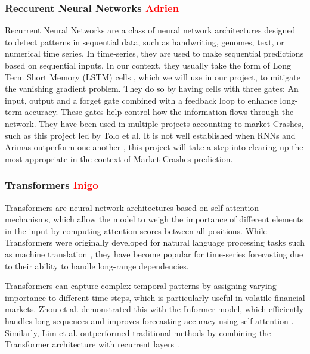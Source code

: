 \documentclass[12pt, letterpaper]{article}
\begin{document}
    \subsubsection*{Reccurent Neural Networks \textcolor{red}{Adrien}}
    Recurrent Neural Networks are a class of neural network architectures designed to detect patterns in sequential data, such as handwriting, genomes, text, or numerical time series. In time-series, they are used to make sequential predictions based on sequential inputs. \cite{Schmidt} In our context, they usually take the form of Long Term Short Memory (LSTM) cells \cite{Hansika}, which we will use in our project, to mitigate the vanishing gradient problem. They do so by having cells with three gates: An input, output and a forget gate combined with a feedback loop to enhance long-term accuracy. These gates help control how the information flows through the network. \cite{Hansika} They have been used in multiple projects accounting to market Crashes, such as this project led by Tolo et al. \cite{Tolo} It is not well established when RNNs and Arimas outperform one another \cite{Hansika}, this project will take a step into clearing up the most appropriate in the context of Market Crashes prediction.

    \subsubsection*{Transformers \textcolor{red}{Inigo}}
Transformers are neural network architectures based on self-attention mechanisms, which allow the model to weigh the importance of different elements in the input by computing attention scores between all positions. While Transformers were originally developed for natural language processing tasks such as machine translation \cite{vaswani2017attention}, they have become popular for time-series forecasting due to their ability to handle long-range dependencies.

Transformers can capture complex temporal patterns by assigning varying importance to different time steps, which is particularly useful in volatile financial markets. Zhou et al. demonstrated this with the Informer model, which efficiently handles long sequences and improves forecasting accuracy using self-attention \cite{zhou2021informer}. Similarly, Lim et al. outperformed traditional methods by combining the Transformer architecture with recurrent layers \cite{lim2021temporal}.
\end{document}
